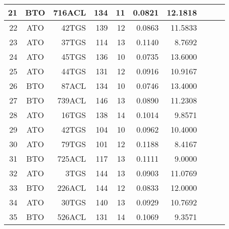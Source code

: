 \begin{tabular}{|r|c|r|r|r|r|r|p{2cm}|p{2cm}|r|}
21 & BTO & 716ACL & 134 & 11 & 0.0821 & 12.1818 &    &    &    \\
\hline
22 & ATO & 42TGS & 139 & 12 & 0.0863 & 11.5833 &    &    &    \\
\hline
23 & ATO & 37TGS & 114 & 13 & 0.1140 & 8.7692 &    &    &    \\
\hline
24 & ATO & 45TGS & 136 & 10 & 0.0735 & 13.6000 &    &    &    \\
\hline
25 & ATO & 44TGS & 131 & 12 & 0.0916 & 10.9167 &    &    &    \\
\hline
26 & BTO & 87ACL & 134 & 10 & 0.0746 & 13.4000 &    &    &    \\
\hline
27 & BTO & 739ACL & 146 & 13 & 0.0890 & 11.2308 &    &    &    \\
\hline
28 & ATO & 16TGS & 138 & 14 & 0.1014 & 9.8571 &    &    &    \\
\hline
29 & ATO & 42TGS & 104 & 10 & 0.0962 & 10.4000 &    &    &    \\
\hline
30 & ATO & 79TGS & 101 & 12 & 0.1188 & 8.4167 &    &    &    \\
\hline
31 & BTO & 725ACL & 117 & 13 & 0.1111 & 9.0000 &    &    &    \\
\hline
32 & ATO & 3TGS & 144 & 13 & 0.0903 & 11.0769 &    &    &    \\
\hline
33 & BTO & 226ACL & 144 & 12 & 0.0833 & 12.0000 &    &    &    \\
\hline
34 & ATO & 30TGS & 140 & 13 & 0.0929 & 10.7692 &    &    &    \\
\hline
35 & BTO & 526ACL & 131 & 14 & 0.1069 & 9.3571 &    &    &    \\
\hline
\end{tabular}
